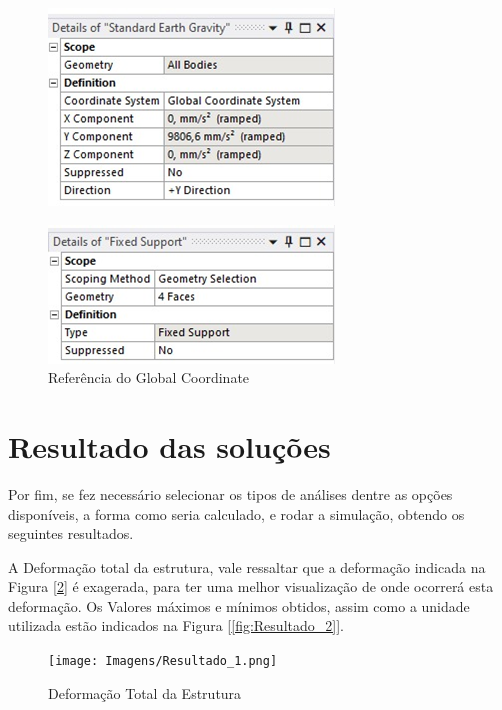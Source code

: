 \documentclass[deposito, acronym, symbols]{fei}
\begin{document}
 \begin{figure}[!htp]
  \centering
  \begin{minipage}{0.7\textwidth}
        \caption{Referência do Global Coordinate}
        \includegraphics[width=0.6\linewidth]{Imagens/força aplicada_3.png}
        \label{fig:força aplicada_3}
  \end{minipage}
  \hfill
  \begin{minipage}{0.7\textwidth}
        \includegraphics[width=0.6\linewidth]{Imagens/força aplicada_4.png}
  \end{minipage}
\end{figure}

\newpage

\section{Resultado das soluções}

 Por fim, se fez necessário selecionar os tipos de análises dentre as opções disponíveis, a forma como seria calculado, e rodar a simulação, obtendo os seguintes resultados.

A Deformação total da estrutura, vale ressaltar que a deformação indicada na Figura [\ref{fig:Resultado_1}] é exagerada, para ter uma melhor visualização de onde ocorrerá esta deformação. Os Valores máximos e mínimos obtidos, assim como a unidade utilizada estão indicados na Figura [\ref{fig:Resultado_2}].

\begin{figure}[!htp]
 \centering
    \caption{Deformação Total da Estrutura}
    \texttt{[image: Imagens/Resultado\_1.png]}
    \label{fig:Resultado_1}
 \end{figure}
 
\end{document}
